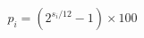 \documentclass[preview]{standalone}
\begin{document}
\begin{align*}
p_i = (2^{s_i/12} - 1) \times 100
\end{align*}
\end{document}
